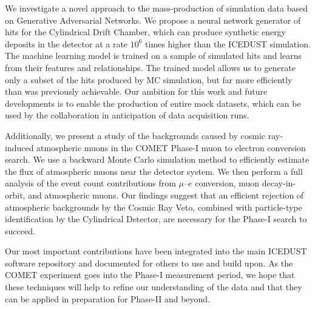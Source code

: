 We investigate a novel approach to the mass-production of simulation data based
on Generative Adversarial Networks. We propose a neural network generator of
hits for the Cylindrical Drift Chamber, which can produce synthetic energy
deposits in the detector at a rate $10^6$ times higher than the ICEDUST
simulation. The machine learning model is trained on a sample of simulated hits
and learns from their features and relationships. The trained model allows us to
generate only a subset of the hits produced by MC simulation, but far more
efficiently than was previously achievable. Our ambition for this work and
future developments is to enable the production of entire mock datasets, which
can be used by the collaboration in anticipation of data acquisition runs.

Additionally, we present a study of the backgrounds caused by cosmic ray-induced
atmospheric muons in the COMET Phase-I muon to electron conversion search. We
use a backward Monte Carlo simulation method to efficiently estimate the flux of
atmospheric muons near the detector system. We then perform a full analysis of
the event count contributions from $\mu$--$e$ conversion, muon decay-in-orbit,
and atmospheric muons. Our findings suggest that an efficient rejection of
atmospheric backgrounds by the Cosmic Ray Veto, combined with particle-type
identification by the Cylindrical Detector, are necessary for the Phase-I search
to succeed.


Our most important contributions have been integrated into the main ICEDUST
software repository and documented for others to use and build upon. As the
COMET experiment goes into the Phase-I measurement period, we hope that these
techniques will help to refine our understanding of the data and that they can
be applied in preparation for Phase-II and beyond.